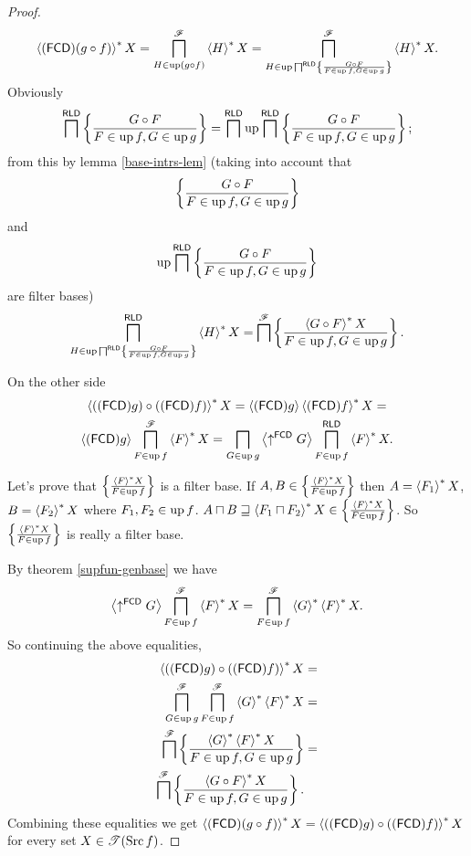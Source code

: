 \begin{proof}
~
\[
\rsupfun{\tofcd(g\circ f)}X=\bigsqcap_{H\in\up(g\circ f)}^{\mathscr{F}}\rsupfun HX=\bigsqcap_{H\in\up\bigsqcap^{\mathsf{RLD}}\setcond{G\circ F}{F\in\up f,G\in\up g}}^{\mathscr{F}}\rsupfun HX.
\]
Obviously
\[
\bigsqcap^{\mathsf{RLD}}\setcond{G\circ F}{F\in\up f,G\in\up g}=\bigsqcap^{\mathsf{RLD}}\up\bigsqcap^{\mathsf{RLD}}\setcond{G\circ F}{F\in\up f,G\in\up g};
\]
from this by lemma \ref{base-intrs-lem} (taking into account that
\[
\setcond{G\circ F}{F\in\up f,G\in\up g}
\]
and
\[
\up\bigsqcap^{\mathsf{RLD}}\setcond{G\circ F}{F\in\up f,G\in\up g}
\]
are filter bases)
\[
\bigsqcap_{H\in\up\bigsqcap^{\mathsf{RLD}}\setcond{G\circ F}{F\in\up f,G\in\up g}}^{\mathsf{RLD}}\rsupfun HX=\bigsqcap^{\mathscr{F}}\setcond{\rsupfun{G\circ F}X}{F\in\up f,G\in\up g}.
\]


On the other side
\begin{multline*}
\rsupfun{(\tofcd g)\circ(\tofcd f)}X=\supfun{\tofcd g}\rsupfun{\tofcd f}X=\\
\supfun{\tofcd g}\bigsqcap_{F\in\up f}^{\mathscr{F}}\rsupfun FX=\bigsqcap_{G\in\up g}\supfun{\uparrow^{\mathsf{FCD}}G}\bigsqcap_{F\in\up f}^{\mathsf{RLD}}\rsupfun FX.
\end{multline*}


Let's prove that $\setcond{\rsupfun FX}{F\in\up f}$ is a filter base.
If $A,B\in\setcond{\rsupfun FX}{F\in\up f}$ then $A=\rsupfun{F_{1}}X$,
$B=\rsupfun{F_{2}}X$ where $F_{1},F_{2}\in\up f$. $A\sqcap B\sqsupseteq\rsupfun{F_{1}\sqcap F_{2}}X\in\setcond{\rsupfun FX}{F\in\up f}$.
So $\setcond{\rsupfun FX}{F\in\up f}$ is really a filter base.

By theorem \ref{supfun-genbase} we have
\[
\supfun{\uparrow^{\mathsf{FCD}}G}\bigsqcap_{F\in\up f}^{\mathscr{F}}\rsupfun FX=\bigsqcap_{F\in\up f}^{\mathscr{F}}\rsupfun G\rsupfun FX.
\]
So continuing the above equalities,
\begin{align*}
\rsupfun{(\tofcd g)\circ(\tofcd f)}X & =\\
\bigsqcap_{G\in\up g}^{\mathscr{F}}\bigsqcap_{F\in\up f}^{\mathscr{F}}\rsupfun G\rsupfun FX & =\\
\bigsqcap^{\mathscr{F}}\setcond{\rsupfun G\rsupfun FX}{F\in\up f,G\in\up g} & =\\
\bigsqcap^{\mathscr{F}}\setcond{\rsupfun{G\circ F}X}{F\in\up f,G\in\up g}.
\end{align*}
Combining these equalities we get $\rsupfun{\tofcd(g\circ f)}X=\rsupfun{(\tofcd g)\circ(\tofcd f)}X$
for every set $X\in\mathscr{T}(\Src f)$.\end{proof}
